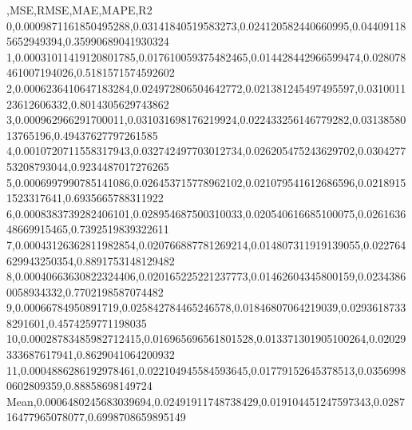 ,MSE,RMSE,MAE,MAPE,R2
0,0.0009871161850495288,0.03141840519583273,0.024120582440660995,0.044091185652949394,0.35990689041930324
1,0.00031011419120801785,0.017610059375482465,0.014428442966599474,0.028078461007194026,0.5181571574592602
2,0.0006236410647183284,0.024972806504642772,0.021381245497495597,0.031001123612606332,0.8014305629743862
3,0.000962966291700011,0.031031698176219924,0.022433256146779282,0.0313858013765196,0.49437627797261585
4,0.0010720711558317943,0.032742497703012734,0.026205475243629702,0.030427753208793044,0.9234487017276265
5,0.0006997990785141086,0.026453715778962102,0.021079541612686596,0.02189151523317641,0.6935665788311922
6,0.0008383739282406101,0.028954687500310033,0.020540616685100075,0.026163648669915465,0.7392519839322611
7,0.00043126362811982854,0.020766887781269214,0.014807311919139055,0.022764629943250354,0.8891753148129482
8,0.00040663630822324406,0.020165225221237773,0.01462604345800159,0.02343860058934332,0.7702198587074482
9,0.00066784950891719,0.025842784465246578,0.01846807064219039,0.02936187338291601,0.4574259771198035
10,0.00028783485982712415,0.016965696561801528,0.013371301905100264,0.02029333687617941,0.8629041064200932
11,0.0004886286192978461,0.022104945584593645,0.01779152645378513,0.03569980602809359,0.88858698149724
Mean,0.0006480245683039694,0.02491911748738429,0.019104451247597343,0.028716477965078077,0.6998708659895149
